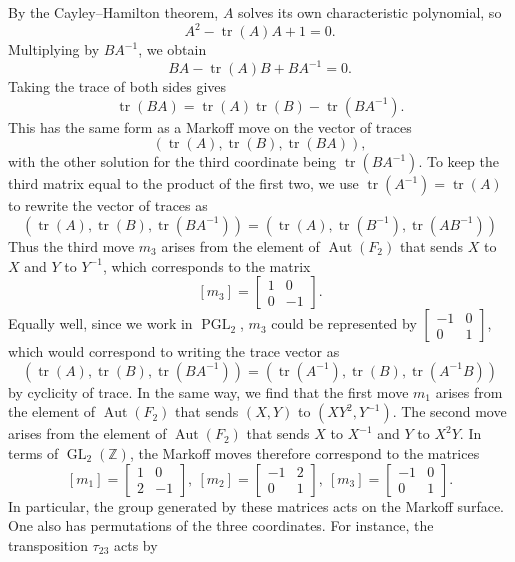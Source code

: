 \documentclass[10pt]{amsart}
\theoremstyle{definition}\newtheorem{defi}[theo]{Definition}\newtheorem{rema}[theo]{Remark}\newtheorem{exam}[theo]{Example}\newtheorem{exem}[theo]{Example}\newtheorem{nota}[theo]{Notation}
\newcommand{\Z}{\mathbb{Z}}
\DeclareMathOperator{\tr}{tr}
\DeclareMathOperator{\GL}{GL}
\DeclareMathOperator{\PGL}{PGL}
\DeclareMathOperator{\Aut}{Aut}
\begin{document}
By the Cayley--Hamilton theorem, $A$ solves its own characteristic polynomial, so
\[
A^2 - \tr(A)A + 1 = 0.
\]
Multiplying by $BA^{-1}$, we obtain
\[
BA - \tr(A)B+ BA^{-1} = 0.
\]
Taking the trace of both sides gives
\[
\tr(BA) = \tr(A)\tr(B) - \tr\left(BA^{-1}\right).
\]
This has the same form as a Markoff move on the vector of traces
\[
(\tr(A),\tr(B),\tr(BA)),
\]
with the other solution for the third coordinate being $\tr(BA^{-1})$. To keep the third matrix equal to the product of the first two, we use $\tr(A^{-1}) = \tr(A)$ to rewrite the vector of traces as
\[
\left(\tr(A),\tr(B),\tr\left(BA^{-1}\right)\right) = \left(\tr(A), \tr\left(B^{-1}\right), \tr\left(AB^{-1}\right)\right)
\]
Thus the third move $m_3$ arises from the element of $\Aut(F_2)$ that sends $X$ to $X$ and $Y$ to $Y^{-1}$, which corresponds to the matrix
\[
[m_3] =
\begin{bmatrix} 1 & 0 \\ 0 & -1
\end{bmatrix}.
\]
Equally well, since we work in $\PGL_2$, $m_3$ could be represented by $\left[
\begin{smallmatrix} -1 & 0 \\ 0 & 1
\end{smallmatrix}\right]$, which would correspond to writing the trace vector as
\[
\left(\tr(A),\tr(B),\tr\left(BA^{-1}\right)\right) = \left(\tr\left(A^{-1}\right), \tr(B), \tr\left(A^{-1} B\right)\right)
\]
by cyclicity of trace. In the same way, we find that the first move $m_1$ arises from the element of $\Aut(F_2)$ that sends $(X,Y)$ to $(XY^2,Y^{-1})$. The second move arises from the element of $\Aut(F_2)$ that sends $X$ to $X^{-1}$ and $Y$ to $X^2Y$. In terms of $\GL_2(\Z)$, the Markoff moves therefore correspond to the matrices
\begin{equation}\label{eqn:markoff-matrices}
[m_1] =
\begin{bmatrix}
1 & 0 \\
2 & -1
\end{bmatrix},\: [m_2] =
\begin{bmatrix}
-1 & 2 \\
0 & 1
\end{bmatrix},\: [m_3] =
\begin{bmatrix}
-1 & 0 \\
0 & 1
\end{bmatrix}.
\end{equation}
In particular, the group generated by these matrices acts on the Markoff surface. One also has permutations of the three coordinates. For instance, the transposition $\tau_{23}$ acts by
\end{document}
